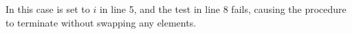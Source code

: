 In this case  is set to $i$ in line 5, and the test in line 8 fails, causing the procedure to terminate without swapping any elements.
